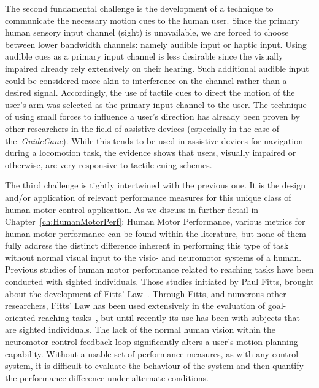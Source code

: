 The second fundamental challenge is the development of a technique to communicate the necessary motion cues to the human user.  Since the primary human sensory input channel (sight) is unavailable, we are forced to choose between lower bandwidth channels:  namely audible input or haptic input.  Using audible cues as a primary input channel is less desirable since the visually impaired already rely extensively on their hearing.  Such additional audible input could be considered more akin to interference on the channel rather than a desired signal.
Accordingly, the use of tactile cues to direct the motion of the user's arm was selected as the primary input channel to the user. The technique of using small forces to influence a user's direction has already been proven by other researchers in the field of assistive devices (especially in the case of the~\textit{GuideCane}).  While this tends to be used in assistive devices for navigation during a locomotion task, the evidence shows that users, visually impaired or otherwise, are very responsive to tactile cuing schemes.

The third challenge is tightly intertwined with the previous one.  It is the design and/or application of relevant performance measures for this unique class of human motor-control application.  As we discuss in further detail in Chapter~\ref{ch:HumanMotorPerf}: Human Motor Performance, various metrics for human motor performance can be found within the literature, but none of them fully address the distinct difference inherent in performing this type of task without normal visual input to the visio- and neuromotor systems of a human.  Previous studies of human motor performance related to reaching tasks have been conducted with sighted individuals.  Those studies initiated by Paul Fitts, brought about the development of Fitts' Law~\cite{FITTS54}.  Through Fitts, and numerous other researchers, Fitts' Law has been used extensively in the evaluation of goal-oriented reaching tasks~\cite{FERRIER98, MURATA99, MURATA99a, YANG-JIN02, GROSSMAN04}, but until recently its use has been with subjects that are sighted individuals.  The lack of the normal human vision within the neuromotor control feedback loop significantly alters a user's motion planning capability.  Without a usable set of performance measures, as with any control system, it is difficult to evaluate the behaviour of the system and then quantify the performance difference under alternate conditions.

